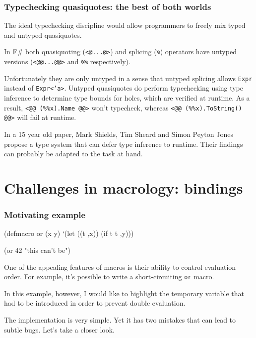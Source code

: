 \documentclass[hyperref={bookmarks=false}]{beamer}
\begin{document}
\begin{frame}[fragile]
\frametitle{Typechecking quasiquotes: the best of both worlds}

The ideal typechecking discipline would allow programmers to freely mix
typed and untyped quasiquotes.

In F\# both quasiquoting (\texttt{<@...@>}) and splicing (\texttt{\%}) operators
have untyped versions (\texttt{<@@...@@>} and \texttt{\%\%} respectively).

Unfortunately they are only untyped in a sense that untyped splicing
allows \texttt{Expr} instead of \texttt{Expr<'a>}. Untyped quasiquotes do perform typechecking
using type inference to determine type bounds for holes, which are verified at runtime.
As a result, \texttt{<@@ (\%\%x).Name @@>} won't typecheck, whereas \texttt{<@@ (\%\%x).ToString() @@>}
will fail at runtime.

In a 15 year old paper, Mark Shields, Tim Sheard and Simon Peyton Jones propose a type system
that can defer type inference to runtime. Their findings can probably be adapted to the task at hand.
\end{frame}

\section{Challenges in macrology: bindings}

\begin{frame}[fragile]
\frametitle{Motivating example}

\begin{lstlistinglike}
\begin{semiverbatim}
(defmacro or (x y)
  `(let ((t ,x))
     (if t t ,y)))

(or 42 "this can't be")
\end{semiverbatim}
\end{lstlistinglike}

One of the appealing features of macros is their ability to
control evaluation order. For example, it's possible to write
a short-circuiting \texttt{or} macro.

In this example, however, I would like to highlight the temporary variable
that had to be introduced in order to prevent double evaluation.

The implementation is very simple. Yet it has two mistakes
that can lead to subtle bugs. Let's take a closer look.
\end{frame}
\end{document}
